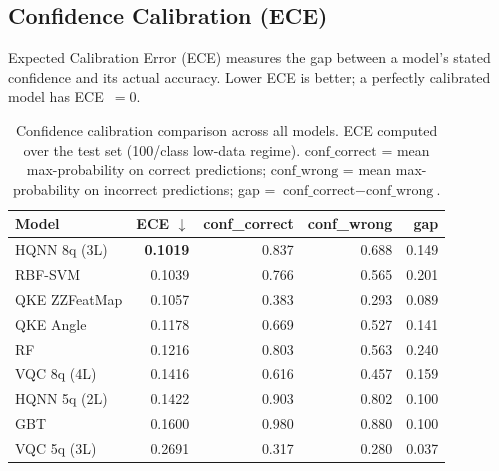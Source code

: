 \documentclass[journal]{IEEEtran}
\begin{document}
\subsection{Confidence Calibration (ECE)}

Expected Calibration Error (ECE) measures the gap between a model's
stated confidence and its actual accuracy. Lower ECE is better; a
perfectly calibrated model has ECE~$= 0$.

\begin{table}[H]
\centering
\caption{Confidence calibration comparison across all models.
         ECE computed over the test set (100/class low-data regime).
         $\text{conf\_correct}$ = mean max-probability on correct predictions;
         $\text{conf\_wrong}$ = mean max-probability on incorrect predictions;
         gap = $\text{conf\_correct} - \text{conf\_wrong}$.}
\begin{tabular}{lrrrr}
\toprule
\textbf{Model} & \textbf{ECE} $\downarrow$ & \textbf{conf\_correct} & \textbf{conf\_wrong} & \textbf{gap} \\
\midrule
HQNN 8q (3L)  & \textbf{0.1019} & 0.837 & 0.688 & 0.149 \\
RBF-SVM       & 0.1039 & 0.766 & 0.565 & 0.201 \\
QKE ZZFeatMap & 0.1057 & 0.383 & 0.293 & 0.089 \\
QKE Angle     & 0.1178 & 0.669 & 0.527 & 0.141 \\
RF            & 0.1216 & 0.803 & 0.563 & 0.240 \\
VQC 8q (4L)   & 0.1416 & 0.616 & 0.457 & 0.159 \\
HQNN 5q (2L)  & 0.1422 & 0.903 & 0.802 & 0.100 \\
GBT           & 0.1600 & 0.980 & 0.880 & 0.100 \\
VQC 5q (3L)   & 0.2691 & 0.317 & 0.280 & 0.037 \\
\bottomrule
\end{tabular}
\end{table}
\end{document}
